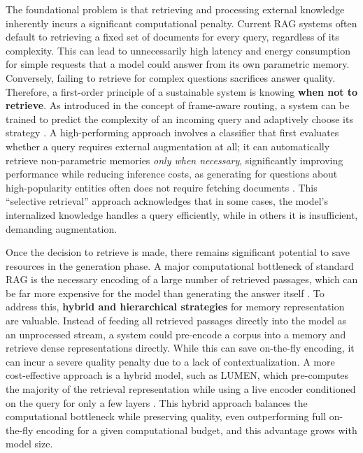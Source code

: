 \documentclass[11pt]{article}
\begin{document}
The foundational problem is that retrieving and processing external knowledge inherently incurs a significant computational penalty. Current RAG systems often default to retrieving a fixed set of documents for every query, regardless of its complexity. This can lead to unnecessarily high latency and energy consumption for simple requests that a model could answer from its own parametric memory. Conversely, failing to retrieve for complex questions sacrifices answer quality. Therefore, a first-order principle of a sustainable system is knowing \textbf{when not to retrieve}. As introduced in the concept of frame-aware routing, a system can be trained to predict the complexity of an incoming query and adaptively choose its strategy \cite{ref455}. A high-performing approach involves a classifier that first evaluates whether a query requires external augmentation at all; it can automatically retrieve non-parametric memories \emph{only when necessary}, significantly improving performance while reducing inference costs, as generating for questions about high-popularity entities often does not require fetching documents \cite{ref456}. This ``selective retrieval'' approach acknowledges that in some cases, the model's internalized knowledge handles a query efficiently, while in others it is insufficient, demanding augmentation.

Once the decision to retrieve is made, there remains significant potential to save resources in the generation phase. A major computational bottleneck of standard RAG is the necessary encoding of a large number of retrieved passages, which can be far more expensive for the model than generating the answer itself \cite{ref457}. To address this, \textbf{hybrid and hierarchical strategies} for memory representation are valuable. Instead of feeding all retrieved passages directly into the model as an unprocessed stream, a system could pre-encode a corpus into a memory and retrieve dense representations directly. While this can save on-the-fly encoding, it can incur a severe quality penalty due to a lack of contextualization. A more cost-effective approach is a hybrid model, such as LUMEN, which pre-computes the majority of the retrieval representation while using a live encoder conditioned on the query for only a few layers \cite{ref457}. This hybrid approach balances the computational bottleneck while preserving quality, even outperforming full on-the-fly encoding for a given computational budget, and this advantage grows with model size.
\end{document}
